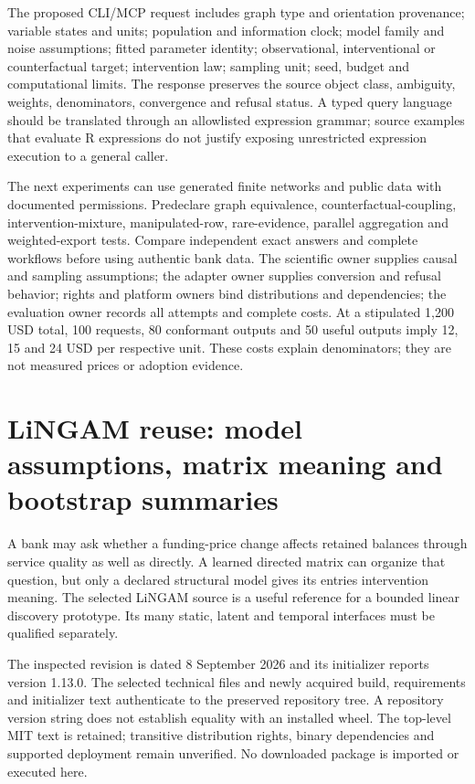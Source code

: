 The proposed CLI/MCP request includes graph type and orientation provenance; variable states and units; population and information clock; model family and noise assumptions; fitted parameter identity; observational, interventional or counterfactual target; intervention law; sampling unit; seed, budget and computational limits. The response preserves the source object class, ambiguity, weights, denominators, convergence and refusal status. A typed query language should be translated through an allowlisted expression grammar; source examples that evaluate R expressions do not justify exposing unrestricted expression execution to a general caller.~\citep{exec24_bnlearn_sources,exec24_bnlearn_contract}

The next experiments can use generated finite networks and public data with documented permissions. Predeclare graph equivalence, counterfactual-coupling, intervention-mixture, manipulated-row, rare-evidence, parallel aggregation and weighted-export tests. Compare independent exact answers and complete workflows before using authentic bank data. The scientific owner supplies causal and sampling assumptions; the adapter owner supplies conversion and refusal behavior; rights and platform owners bind distributions and dependencies; the evaluation owner records all attempts and complete costs. At a stipulated 1,200 USD total, 100 requests, 80 conformant outputs and 50 useful outputs imply 12, 15 and 24 USD per respective unit. These costs explain denominators; they are not measured prices or adoption evidence.~\citep{exec24_bnlearn_contract}


\section{LiNGAM reuse: model assumptions, matrix meaning and bootstrap summaries}
\label{sec:exec24-lingam-reuse}

A bank may ask whether a funding-price change affects retained balances
through service quality as well as directly. A learned directed matrix
can organize that question, but only a declared structural model gives
its entries intervention meaning. The selected LiNGAM source is a useful
reference for a bounded linear discovery prototype. Its many static,
latent and temporal interfaces must be qualified separately.
\citep{exec24_lingam_source,exec24_lingam_choice}

The inspected revision is dated 8 September 2026 and its initializer
reports version 1.13.0. The selected technical files and newly acquired
build, requirements and initializer text authenticate to the preserved
repository tree. A repository version string does not establish equality
with an installed wheel. The top-level MIT text is retained; transitive
distribution rights, binary dependencies and supported deployment remain
unverified. No downloaded package is imported or executed here.
\citep{exec24_lingam_source}

